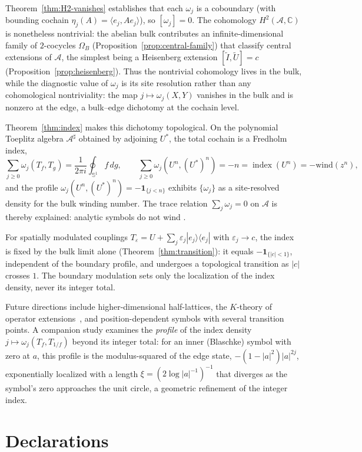 \documentclass[10pt]{amsart}
\newcommand{\1}{{\mathbb{I}}}
\newcommand{\ind}{\operatorname{index}}
\numberwithin{equation}{section}
\begin{document}
Theorem~\ref{thm:H2-vanishes} establishes that each $\omega_j$ is a coboundary (with bounding
cochain $\eta_j(A) = \langle e_j,Ae_j\rangle$), so $[\omega_j]=0$. The cohomology
$H^2(\mathcal{A},\mathbb{C})$ is nonetheless nontrivial: the abelian bulk contributes an
infinite-dimensional family of $2$-cocycles $\Omega_B$ (Proposition~\ref{prop:central-family})
that classify central extensions of $\mathcal{A}$, the simplest being a Heisenberg extension
$[\widetilde I,\widetilde U]=c$ (Proposition~\ref{prop:heisenberg}). Thus the nontrivial
cohomology lives in the bulk, while the diagnostic value of $\omega_j$ is its
site resolution rather than any cohomological nontriviality: the map
$j \mapsto \omega_j(X,Y)$
vanishes in the bulk and is nonzero at the edge, a bulk--edge dichotomy at
the cochain level.

Theorem~\ref{thm:index} makes this dichotomy topological.
On the polynomial Toeplitz algebra $\mathcal{A}^\sharp$ obtained by adjoining $U^*$, the total
cochain is a Fredholm index,
\[
\sum_{j\ge0}\omega_j(T_f,T_g)=\frac{1}{2\pi i}\oint_{\mathbb{S}^1} f\,dg,
\qquad
\sum_{j\ge0}\omega_j(U^n,(U^*)^n)=-n=\ind(U^n)=-\mathrm{wind}(z^n),
\]
and the profile $\omega_j(U^n,(U^*)^n)=-\mathbf{1}_{\{j<n\}}$ exhibits $\{\omega_j\}$ as a
site-resolved density for the bulk winding number. The trace relation $\sum_j\omega_j=0$ on
$\mathcal{A}$ is thereby explained: analytic symbols do not wind \cite{AriciMesland,ProdanSchulzBaldes,Thiang}.

For spatially modulated couplings $T_\varepsilon=U+\sum_j\varepsilon_j|e_j\rangle\langle e_j|$
with $\varepsilon_j\to c$, the index is fixed by the bulk limit alone
(Theorem~\ref{thm:transition}): it equals $-\mathbf{1}_{\{|c|<1\}}$, independent of the boundary
profile, and undergoes a topological transition as $|c|$ crosses $1$. The boundary modulation
sets only the localization of the index density, never its integer total.

Future directions include higher-dimensional half-lattices, the $K$-theory of operator
extensions~\cite{Kasparov80}, and position-dependent symbols with several transition points.
A companion study examines the \emph{profile} of the index density $j\mapsto\omega_j(T_f,T_{1/f})$
beyond its integer total: for an inner (Blaschke) symbol with zero at $a$, this profile is the
modulus-squared of the edge state, $-(1-|a|^2)|a|^{2j}$, exponentially localized with a length
$\xi=(2\log|a|^{-1})^{-1}$ that diverges as the symbol's zero approaches the unit circle, a
geometric refinement of the integer index.
\section*{Declarations}
\end{document}

